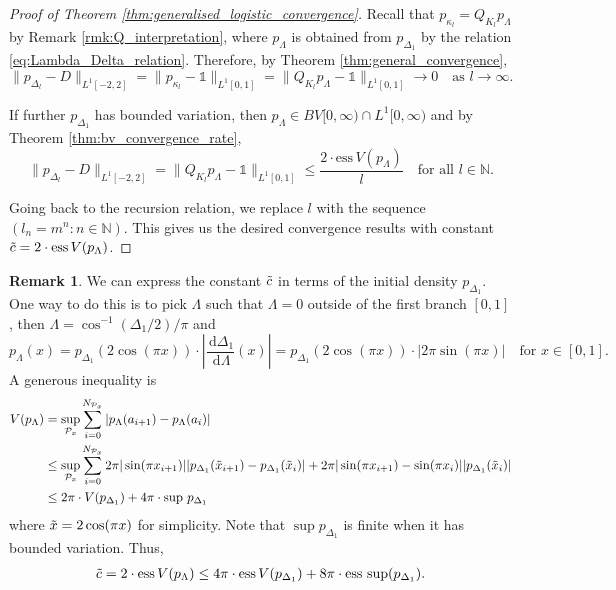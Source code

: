 \documentclass[a4paper]{article}
\theoremstyle{definition}
\newtheorem{remark}[theorem]{Remark}%
\numberwithin{equation}{section}
\numberwithin{theorem}{section}
\newcommand{\de}{\,\mathrm{d}}
\newcommand{\ess}{\mathrm{ess}\,}
\begin{document}
{\begin{proof}[Proof of Theorem \ref{thm:generalised_logistic_convergence}]
    Recall that $p_{\kappa_l}=Q_{K_l}p_\Lambda$ by Remark \ref{rmk:Q_interpretation}, where $p_\Lambda$ is obtained from $p_{\Delta_1}$ by the relation \eqref{eq:Lambda_Delta_relation}. Therefore, by Theorem \ref{thm:general_convergence},
    \begin{equation*}
        \lVert p_{\Delta_{l}}-D\rVert_{ L^1[-2,2]}=\lVert p_{\kappa_{l}}-\mathds{1}\rVert_{ L^1[0,1]} = \lVert Q_{K_l}p_\Lambda-\mathds{1}\rVert_{ L^1[0,1]} \rightarrow 0\quad\text{as $l\rightarrow\infty$.}
    \end{equation*}

    If further $p_{\Delta_1}$ has bounded variation, then $p_\Lambda\in BV[0,\infty)\cap L^1[0,\infty)$ and by Theorem \ref{thm:bv_convergence_rate},
    \begin{equation*}
        \lVert p_{\Delta_{l}}-D\rVert_{ L^1[-2,2]}= \lVert Q_{K_l}p_\Lambda-\mathds{1}\rVert_{ L^1[0,1]} \leq\frac{2\cdot\ess V(p_\Lambda)}{l}\quad\text{for all $l\in\mathbb{N}$.}
    \end{equation*}

    Going back to the recursion relation, we replace $l$ with the sequence $(l_n=m^n:n\in\mathbb{N})$. This gives us the desired convergence results with constant $\Tilde{c}=2\cdot\ess V(p_\Lambda)$.
\end{proof}

\begin{remark} \label{rmk:constant_initial}
    We can express the constant $\Tilde{c}$ in terms of the initial density $p_{\Delta_1}$. One way to do this is to pick $\Lambda$ such that $\Lambda=0$ outside of the first branch $[0,1]$, then $\Lambda=\cos^{-1}(\Delta_1/{2})/\pi$ and
    \begin{equation*}
        p_\Lambda(x)= p_{\Delta_1}(2\cos(\pi x))\cdot\left|\frac{\de\Delta_1}{\de\Lambda}(x)\right| = p_{\Delta_1}(2\cos(\pi x))\cdot \left|2\pi\sin(\pi x)\right|\quad\text{for $x\in[0,1].$}
    \end{equation*}
    A generous inequality is
    \begin{align*}
        V(p_\Lambda) &= \sup_{\mathcal{P}_x}\sum_{i=0}^{N_{\mathcal{P}_x}} |p_\Lambda(a_{i+1})-p_\Lambda(a_i)|\\
        &\leq \sup_{\mathcal{P}_x}\sum_{i=0}^{N_{\mathcal{P}_x}}2\pi|\sin(\pi x_{i+1})||p_{\Delta_1}(\Tilde{x}_{i+1})-p_{\Delta_1}(\Tilde{x}_{i})|+ 2\pi|\sin(\pi x_{i+1})-\sin(\pi x_i)||p_{\Delta_1}(\Tilde{x}_i)|\\
        &\leq2\pi\cdot V(p_{\Delta_1}) + 4\pi\cdot\sup\,p_{\Delta_1}
    \end{align*}
    where $\Tilde{x}=2\cos(\pi x)$ for simplicity. Note that $\sup p_{\Delta_1}$ is finite when it has bounded variation. Thus, 
    \begin{align*}
        \Tilde{c} = 2\cdot\ess V(p_\Lambda)\leq4\pi\cdot\ess V(p_{\Delta_1})+8\pi\cdot\ess\sup(p_{\Delta_1}).
    \end{align*}
\end{remark}

}
\end{document}
